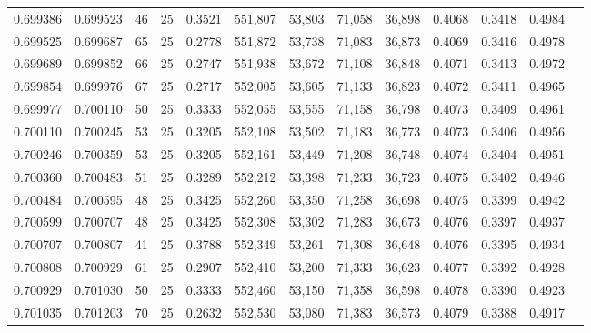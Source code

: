 \begin{tabular}{rrrrrrrrrrrrr}
0.699386 & 0.699523 &    46 &  25 &                                     0.3521 & 551,807 &  53,803 &  71,058 &  36,898 & 0.4068 & 0.3418 & 0.4984 \\
0.699525 & 0.699687 &    65 &  25 &                                     0.2778 & 551,872 &  53,738 &  71,083 &  36,873 & 0.4069 & 0.3416 & 0.4978 \\
0.699689 & 0.699852 &    66 &  25 &                                     0.2747 & 551,938 &  53,672 &  71,108 &  36,848 & 0.4071 & 0.3413 & 0.4972 \\
0.699854 & 0.699976 &    67 &  25 &                                     0.2717 & 552,005 &  53,605 &  71,133 &  36,823 & 0.4072 & 0.3411 & 0.4965 \\
0.699977 & 0.700110 &    50 &  25 &                                     0.3333 & 552,055 &  53,555 &  71,158 &  36,798 & 0.4073 & 0.3409 & 0.4961 \\
0.700110 & 0.700245 &    53 &  25 &                                     0.3205 & 552,108 &  53,502 &  71,183 &  36,773 & 0.4073 & 0.3406 & 0.4956 \\
0.700246 & 0.700359 &    53 &  25 &                                     0.3205 & 552,161 &  53,449 &  71,208 &  36,748 & 0.4074 & 0.3404 & 0.4951 \\
0.700360 & 0.700483 &    51 &  25 &                                     0.3289 & 552,212 &  53,398 &  71,233 &  36,723 & 0.4075 & 0.3402 & 0.4946 \\
0.700484 & 0.700595 &    48 &  25 &                                     0.3425 & 552,260 &  53,350 &  71,258 &  36,698 & 0.4075 & 0.3399 & 0.4942 \\
0.700599 & 0.700707 &    48 &  25 &                                     0.3425 & 552,308 &  53,302 &  71,283 &  36,673 & 0.4076 & 0.3397 & 0.4937 \\
0.700707 & 0.700807 &    41 &  25 &                                     0.3788 & 552,349 &  53,261 &  71,308 &  36,648 & 0.4076 & 0.3395 & 0.4934 \\
0.700808 & 0.700929 &    61 &  25 &                                     0.2907 & 552,410 &  53,200 &  71,333 &  36,623 & 0.4077 & 0.3392 & 0.4928 \\
0.700929 & 0.701030 &    50 &  25 &                                     0.3333 & 552,460 &  53,150 &  71,358 &  36,598 & 0.4078 & 0.3390 & 0.4923 \\
0.701035 & 0.701203 &    70 &  25 &                                     0.2632 & 552,530 &  53,080 &  71,383 &  36,573 & 0.4079 & 0.3388 & 0.4917 \\

\end{tabular}
